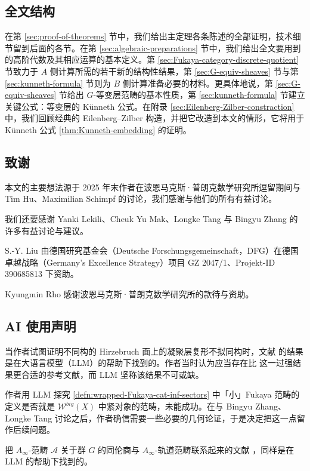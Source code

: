 \documentclass[11pt,a4paper]{article}
\theoremstyle{cnth}
\begin{document}
\subsection{全文结构}

在第 \ref{sec:proof-of-theorems} 节中，我们给出主定理各条陈述的全部证明，技术细节留到后面的各节。在第 \ref{sec:algebraic-preparations} 节中，我们给出全文要用到的高阶代数及其相应运算的基本定义。第 \ref{sec:Fukaya-category-discrete-quotient} 节致力于 $A$ 侧计算所需的若干新的结构性结果，第 \ref{sec:G-equiv-sheaves} 节与第 \ref{sec:kunneth-formula} 节则为 $B$ 侧计算准备必要的材料。更具体地说，第 \ref{sec:G-equiv-sheaves} 节给出 $G$-等变层范畴的基本性质，第 \ref{sec:kunneth-formula} 节建立关键公式：等变层的 K\"unneth 公式。在附录 \ref{sec:Eilenberg-Zilber-constraction} 中，我们回顾经典的 Eilenberg--Zilber 构造，并把它改造到本文的情形，它将用于 Künneth 公式 \ref{thm:Kunneth-embedding} 的证明。

\subsection*{致谢}

本文的主要想法源于 2025 年末作者在波恩马克斯·普朗克数学研究所逗留期间与 Tim Hu、Maximilian Schimpf 的讨论，我们感谢与他们的所有有益讨论。

我们还要感谢 Yanki Lekili、Cheuk Yu Mak、Longke Tang 与 Bingyu Zhang 的许多有益讨论与建议。

S.-Y. Liu 由德国研究基金会（Deutsche Forschungsgemeinschaft，DFG）在德国卓越战略（Germany's Excellence Strategy）项目 GZ 2047/1、Projekt-ID 390685813 下资助。

Kyungmin Rho 感谢波恩马克斯·普朗克数学研究所的款待与资助。

\subsection*{AI 使用声明}

当作者试图证明不同构的 Hirzebruch 面上的凝聚层复形不拟同构时，文献 \cite{BM01} 的结果是在大语言模型（LLM）的帮助下找到的。作者当时认为应当存在比 \cite{BM01} 这一过强结果更合适的参考文献，而 LLM 坚称该结果不可或缺。

作者用 LLM 探究 \ref{defn:wrapped-Fukaya-cat-inf-sectors} 中「小」Fukaya 范畴的定义是否就是 $\mathcal{W}^{big} (X)$ 中紧对象的范畴，未能成功。在与 Bingyu Zhang、Longke Tang 讨论之后，作者确信需要一些必要的几何论证，于是决定把这一点留作后续问题。

把 $A_{\infty}$-范畴 $\mathcal{A}$ 关于群 $G$ 的同伦商与 $A_{\infty}$-轨道范畴联系起来的文献 \cite{Christ26}，同样是在 LLM 的帮助下找到的。
\end{document}
